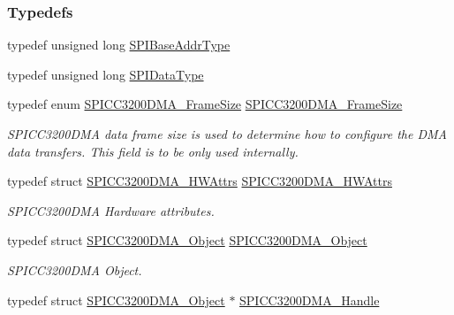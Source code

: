 \subsubsection*{Typedefs}
\begin{DoxyCompactItemize}
\item 
typedef unsigned long \hyperlink{_s_p_i_c_c3200_d_m_a_8h_a4b7e9f3739f6196bed13f9c3c549c96d}{S\+P\+I\+Base\+Addr\+Type}
\item 
typedef unsigned long \hyperlink{_s_p_i_c_c3200_d_m_a_8h_ac69c2f2d8cda29733c058bf8e0233af7}{S\+P\+I\+Data\+Type}
\item 
typedef enum \hyperlink{_s_p_i_c_c3200_d_m_a_8h_a886c3ca11a73823e4f3ab5eefc0fbebb}{S\+P\+I\+C\+C3200\+D\+M\+A\+\_\+\+Frame\+Size} \hyperlink{_s_p_i_c_c3200_d_m_a_8h_ad45a7b86b506d187ac96bc24d0475cd6}{S\+P\+I\+C\+C3200\+D\+M\+A\+\_\+\+Frame\+Size}
\begin{DoxyCompactList}\small\item\em S\+P\+I\+C\+C3200\+D\+M\+A data frame size is used to determine how to configure the D\+M\+A data transfers. This field is to be only used internally. \end{DoxyCompactList}\item 
typedef struct \hyperlink{struct_s_p_i_c_c3200_d_m_a___h_w_attrs}{S\+P\+I\+C\+C3200\+D\+M\+A\+\_\+\+H\+W\+Attrs} \hyperlink{_s_p_i_c_c3200_d_m_a_8h_a62f07fdc6837972d70b05231fc3b3501}{S\+P\+I\+C\+C3200\+D\+M\+A\+\_\+\+H\+W\+Attrs}
\begin{DoxyCompactList}\small\item\em S\+P\+I\+C\+C3200\+D\+M\+A Hardware attributes. \end{DoxyCompactList}\item 
typedef struct \hyperlink{struct_s_p_i_c_c3200_d_m_a___object}{S\+P\+I\+C\+C3200\+D\+M\+A\+\_\+\+Object} \hyperlink{_s_p_i_c_c3200_d_m_a_8h_a5a581b5a475f9cd3e8b23355cc30ab7f}{S\+P\+I\+C\+C3200\+D\+M\+A\+\_\+\+Object}
\begin{DoxyCompactList}\small\item\em S\+P\+I\+C\+C3200\+D\+M\+A Object. \end{DoxyCompactList}\item 
typedef struct \hyperlink{struct_s_p_i_c_c3200_d_m_a___object}{S\+P\+I\+C\+C3200\+D\+M\+A\+\_\+\+Object} $\ast$ \hyperlink{_s_p_i_c_c3200_d_m_a_8h_ae757f6e0468145143c9c839a4e3cf353}{S\+P\+I\+C\+C3200\+D\+M\+A\+\_\+\+Handle}
\end{DoxyCompactItemize}
